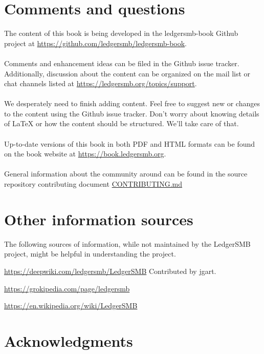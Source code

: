 \section*{Comments and questions}
\label{sec-comments}

The content of this book is being developed in the ledgersmb-book Github project at
\url{https://github.com/ledgersmb/ledgersmb-book}. \\
~ \\
Comments and enhancement ideas can be filed in the Github issue tracker. 
Additionally, discussion about the content
can be organized on the mail list or chat channels listed at \url{https://ledgersmb.org/topics/support}.\\
~ \\
We desperately need to finish adding content. Feel free to suggest new or changes to the content
using the Github issue tracker. Don't worry about knowing details of \LaTeX{} or how the
content should be structured. We'll take care of that.\\
~ \\
Up-to-date versions of this book in both PDF and HTML formats can be found on the book website at \url{https://book.ledgersmb.org}.\\
~ \\
General information about the community around \lsmbsp can be found in the source repository contributing document
\href{https://github.com/ledgersmb/LedgerSMB/blob/master/CONTRIBUTING.md}{CONTRIBUTING.md}

\section*{Other information sources}
\label{sec-other-sources}

The following sources of information, while not maintained by the LedgerSMB project, might be helpful in understanding the project.

\url{https://deepwiki.com/ledgersmb/LedgerSMB} Contributed by jgart.
 
\url{https://grokipedia.com/page/ledgersmb}

\url{https://en.wikipedia.org/wiki/LedgerSMB}


\section*{Acknowledgments}
\label{sec-acknowledgements}

